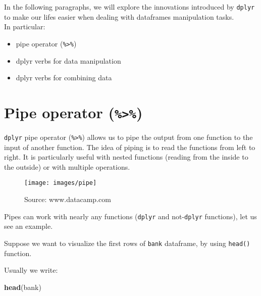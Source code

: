 \documentclass[]{book}
\newenvironment{Shaded}{\begin{snugshade}}{\end{snugshade}}
\newcommand{\KeywordTok}[1]{\textcolor[rgb]{0.13,0.29,0.53}{\textbf{{#1}}}}
\newcommand{\NormalTok}[1]{{#1}}
\providecommand{\tightlist}{%
  \setlength{\itemsep}{0pt}\setlength{\parskip}{0pt}}
\def\tightlist{}
\begin{document}
In the following paragraphs, we will explore the innovations introduced
by \texttt{dplyr} to make our lifes easier when dealing with dataframes
manipulation tasks.\\
In particular:

\begin{itemize}
\tightlist
\item
  pipe operator (\texttt{\%\textgreater{}\%})
\item
  dplyr verbs for data manipulation
\item
  dplyr verbs for combining data
\end{itemize}

\section{\texorpdfstring{Pipe operator
(\texttt{\%\textgreater{}\%})}{Pipe operator (\%\textgreater{}\%)}}\label{pipe-operator}

\texttt{dplyr} pipe operator (\texttt{\%\textgreater{}\%}) allows us to
pipe the output from one function to the input of another function. The
idea of piping is to read the functions from left to right. It is
particularly useful with nested functions (reading from the inside to
the outside) or with multiple operations.

\begin{figure}[h]

{\centering \texttt{[image: images/pipe]} 

}

\caption{Source: www.datacamp.com}\label{fig:g2}
\end{figure}

Pipes can work with nearly any functions (\texttt{dplyr} and
not-\texttt{dplyr} functions), let us see an example.

Suppose we want to visualize the first rows of \texttt{bank} dataframe,
by using \texttt{head()} function.

\clearpage

Usually we write:

\begin{Shaded}
\begin{Highlighting}[]
\KeywordTok{head}\NormalTok{(bank)}
\end{Highlighting}
\end{Shaded}
\end{document}
